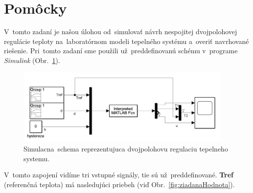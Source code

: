 \documentclass{article}
\begin{document}
\clearpage

\section{Pomôcky}
\label{sec:pomocky}

V~tomto zadaní je našou úlohou od~simulovať návrh nespojitej dvojpolohovej regulácie teploty na~laboratórnom
modeli tepelného systému a~overiť navrhované riešenie. Pri~tomto zadaní sme použili už~preddefinovanú schému
v~programe \textit{Simulink} (Obr.~\ref{fig:schema}).

\begin{figure}[!htbp]
	\begin{center}
		\includegraphics[width=0.95\textwidth]{./include/schema.png}
		\caption{Simulacna~schema reprezentujuca dvojpolohovu regulaciu tepelneho systemu.}
		\label{fig:schema}
	\end{center}
\end{figure}

V~tomto zapojení vidíme tri vstupné signály, tie sú už~preddefinované. \textbf{Tref} (referenčná teplota)
má nasledujúci priebeh (viď Obr.~\ref{fig:ziadanaHodnota}).
\end{document}
